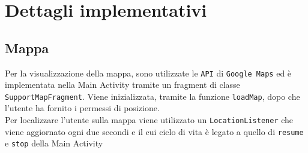 \documentclass[11pt]{article}
\begin{document}
\section{Dettagli implementativi}
\subsection{Mappa}
Per la visualizzazione della mappa, sono utilizzate le \texttt{API} di \texttt{Google Maps} ed è implementata nella Main Activity tramite un fragment di classe \texttt{SupportMapFragment}. Viene inizializzata, tramite la funzione \texttt{loadMap}, dopo che l'utente ha fornito i permessi di posizione. \\
Per localizzare l'utente sulla mappa viene utilizzato un \texttt{LocationListener} che viene aggiornato ogni due secondi e il cui ciclo di vita è legato a quello di \texttt{resume} e \texttt{stop} della Main Activity
\end{document}
